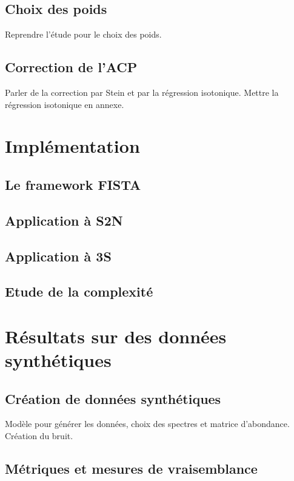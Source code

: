 \documentclass[a4paper, twoside, table, justified,
               nofonts, nobib, nohyper, 10pt, french]{tufte-book}
\begin{document}
\subsection{Choix des poids}
Reprendre l'étude pour le choix des poids.

\subsection{Correction de l'ACP}
Parler de la correction par Stein et par la régression isotonique. Mettre la régression isotonique en annexe.

%
\section{Implémentation}

\subsection{Le framework FISTA}

\subsection{Application à S2N}

\subsection{Application à 3S}

\subsection{Etude de la complexité}

%
\section{Résultats sur des données synthétiques}

\subsection{Création de données synthétiques}

Modèle pour générer les données, choix des spectres et matrice d'abondance. Création du bruit.

\subsection{Métriques et mesures de vraisemblance}
\end{document}
